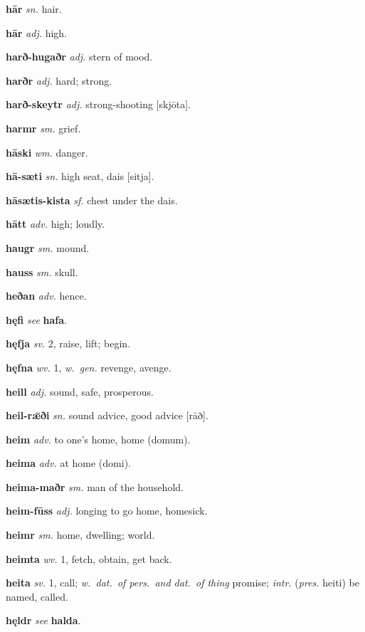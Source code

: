 \documentclass[12pt,letterpaper]{book}
\begin{document}
\noindent
\textbf{hār} \textit{sn.} hair.

\noindent
\textbf{hār} \textit{adj.} high.

\noindent
\textbf{harð-hugaðr} \textit{adj.} stern of mood.

\noindent
\textbf{harðr} \textit{adj.} hard; strong.

\noindent
\textbf{harð-skeytr} \textit{adj.} strong-shooting [skjōta].

\noindent
\textbf{harmr} \textit{sm.} grief.

\noindent
\textbf{hāski} \textit{wm.} danger.

\noindent
\textbf{hā-sæti} \textit{sn.} high seat, dais [sitja].

\noindent
\textbf{hāsætis-kista} \textit{sf.} chest under the dais.

\noindent
\textbf{hātt} \textit{adv.} high; loudly.

\noindent
\textbf{haugr} \textit{sm.} mound.

\noindent
\textbf{hauss} \textit{sm.} skull.

\noindent
\textbf{heðan} \textit{adv.} hence.

\noindent
\textbf{hęfi} \textit{} \textit{see} \textbf{hafa}.

\noindent
\textbf{hęfja} \textit{sv.} 2, raise, lift; begin.

\noindent
\textbf{hęfna} \textit{wv.} 1, \textit{w.\ gen.} revenge, avenge.

\noindent
\textbf{heill} \textit{adj.} sound, safe, prosperous.

\noindent
\textbf{heil-rǣði} \textit{sn.} sound advice, good advice [rāð].

\noindent
\textbf{heim} \textit{adv.} to one's home, home (domum).

\noindent
\textbf{heima} \textit{adv.} at home (domi).

\noindent
\textbf{heima-maðr} \textit{sm.} man of the household.

\noindent
\textbf{heim-fūss} \textit{adj.} longing to go home, homesick.

\noindent
\textbf{heimr} \textit{sm.} home, dwelling; world.

\noindent
\textbf{heimta} \textit{wv.} 1, fetch, obtain, get back.

\noindent
\textbf{heita} \textit{sv.} 1, call; \textit{w.\ dat.\ of pers.\ and dat.\ of
	thing} promise; \textit{intr.} (\textit{pres.} heiti) be named,
	called.

\noindent
\textbf{hęldr} \textit{} \textit{see} \textbf{halda}.
\end{document}
